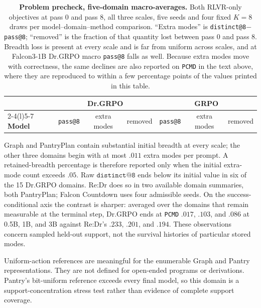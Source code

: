\documentclass{article}
\makeatletter
\newcommand{\1}{\mathbf 1}
\newcommand{\pmd}{\texttt{PCMD}}
\newcommand{\distk}{\texttt{distinct@8}}
\theoremstyle{remark}
\theoremstyle{definition}
\theoremstyle{plain}
\makeatother
\begin{document}
\begin{table}[h]
  \centering
  \caption{\textbf{Problem precheck, five-domain macro-averages.} Both
  RLVR-only objectives at pass 0 and pass 8, all three scales, five seeds
  and four fixed $K=8$ draws per model--domain--method comparison. ``Extra modes'' is
  \distk{}$-$\texttt{pass@8}; ``removed'' is the fraction of that
  quantity lost between pass 0 and pass 8. Breadth loss is present at every
  scale and is far from uniform across scales, and at Falcon3-1B Dr.GRPO
  macro \texttt{pass@8} falls as well. Because extra modes move with
  correctness, the same declines are also reported on \pmd{} in the text above,
  where they are reproduced to within a few percentage points of the values
  printed in this table.}
  \label{tab:baseline-collapse-precheck}
  \small
  \setlength{\tabcolsep}{4.5pt}
  \begin{tabular}{@{}l*{6}{c}@{}}
    \toprule
    & \multicolumn{3}{c}{\textbf{Dr.GRPO}} & \multicolumn{3}{c}{\textbf{GRPO}} \\
    \cmidrule(lr){2-4}\cmidrule(l){5-7}
    \textbf{Model} & \texttt{pass@8} & extra modes & removed
                   & \texttt{pass@8} & extra modes & removed \\
    \midrule
    
  \end{tabular}
\end{table}


Graph and PantryPlan contain substantial initial breadth at every scale;
the other three domains begin with at most $.011$ extra modes per prompt.
A retained-breadth percentage is therefore reported only when the initial
extra-mode count exceeds $.05$. Raw $\texttt{distinct@8}$ ends below its
initial value in six of the 15 Dr.GRPO domains. Re:Dr does so in
two available domain summaries, both PantryPlan; Falcon Countdown uses
four admissible seeds. On the success-conditional axis the contrast is
sharper: averaged over the domains that remain measurable at the terminal
step, Dr.GRPO ends at \pmd{} $.017$, $.103$, and $.086$ at 0.5B, 1B, and 3B
against Re:Dr's $.233$, $.201$, and $.194$. These observations concern
sampled held-out support, not the survival histories of particular stored
modes.

Uniform-action references are meaningful for the enumerable Graph and
Pantry representations. They are not defined for open-ended programs or
derivations. Pantry's bit-uniform reference exceeds every final model, so
this domain is a support-concentration stress test rather than evidence
of complete support coverage.
\end{document}
